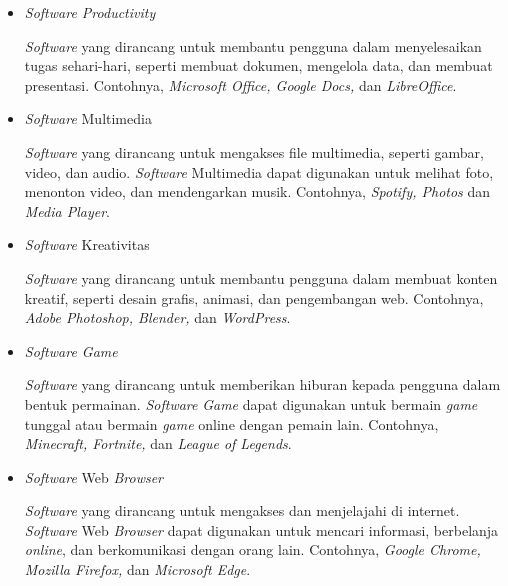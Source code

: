 \documentclass[12pt]{article}
\begin{document}
\begin{itemize}
\begin{enumerate}
            \begin{itemize}
                \item \textit{Software Productivity}
                \par
                \textit{Software} yang dirancang untuk membantu pengguna dalam menyelesaikan tugas sehari-hari, seperti membuat dokumen, mengelola data, dan membuat presentasi. Contohnya, \textit{Microsoft Office, Google Docs,} dan \textit{LibreOffice}.
                \item \textit{Software} Multimedia
                \par
                \textit{Software} yang dirancang untuk mengakses file multimedia, seperti gambar, video, dan audio. \textit{Software} Multimedia dapat digunakan untuk melihat foto, menonton video, dan mendengarkan musik. Contohnya, \textit{Spotify, Photos} dan \textit{Media Player}.
                \item \textit{Software} Kreativitas
                \par
                \textit{Software} yang dirancang untuk membantu pengguna dalam membuat konten kreatif, seperti desain grafis, animasi, dan pengembangan web. Contohnya, \textit{Adobe Photoshop, Blender,} dan \textit{WordPress}.
                \item \textit{Software Game}
                \par
                \textit{Software} yang dirancang untuk memberikan hiburan kepada pengguna dalam bentuk permainan. \textit{Software} \textit{Game} dapat digunakan untuk bermain \textit{game} tunggal atau bermain \textit{game} online dengan pemain lain. Contohnya, \textit{Minecraft, Fortnite,} dan \textit{League of Legends}.
                \item \textit{Software} Web \textit{Browser}
                \par
                \textit{Software} yang dirancang untuk mengakses dan menjelajahi di internet. \textit{Software} Web \textit{Browser} dapat digunakan untuk mencari informasi, berbelanja \textit{online}, dan berkomunikasi dengan orang lain. Contohnya, \textit{Google Chrome, Mozilla Firefox,} dan \textit{Microsoft Edge}.
            \end{itemize}
        \end{enumerate}


\end{itemize}
\end{document}
